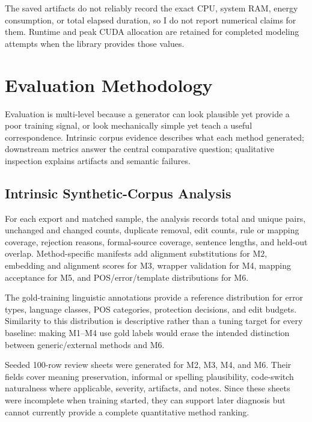 \documentclass[12pt, a4paper, twoside, openany]{report}
\begin{document}
The saved artifacts do not reliably record the exact CPU, system RAM, energy consumption, or total elapsed duration, so I do not report numerical claims for them. Runtime and peak CUDA allocation are retained for completed modeling attempts when the library provides those values.


\section{Evaluation Methodology}

Evaluation is multi-level because a generator can look plausible yet provide a poor training signal, or look mechanically simple yet teach a useful correspondence. Intrinsic corpus evidence describes what each method generated; downstream metrics answer the central comparative question; qualitative inspection explains artifacts and semantic failures.


\subsection{Intrinsic Synthetic-Corpus Analysis}

For each export and matched sample, the analysis records total and unique pairs, unchanged and changed counts, duplicate removal, edit counts, rule or mapping coverage, rejection reasons, formal-source coverage, sentence lengths, and held-out overlap. Method-specific manifests add alignment substitutions for M2, embedding and alignment scores for M3, wrapper validation for M4, mapping acceptance for M5, and POS/error/template distributions for M6.

The gold-training linguistic annotations provide a reference distribution for error types, language classes, POS categories, protection decisions, and edit budgets. Similarity to this distribution is descriptive rather than a tuning target for every baseline: making M1--M4 use gold labels would erase the intended distinction between generic/external methods and M6.

Seeded 100-row review sheets were generated for M2, M3, M4, and M6. Their fields cover meaning preservation, informal or spelling plausibility, code-switch naturalness where applicable, severity, artifacts, and notes. Since these sheets were incomplete when training started, they can support later diagnosis but cannot currently provide a complete quantitative method ranking.
\end{document}
